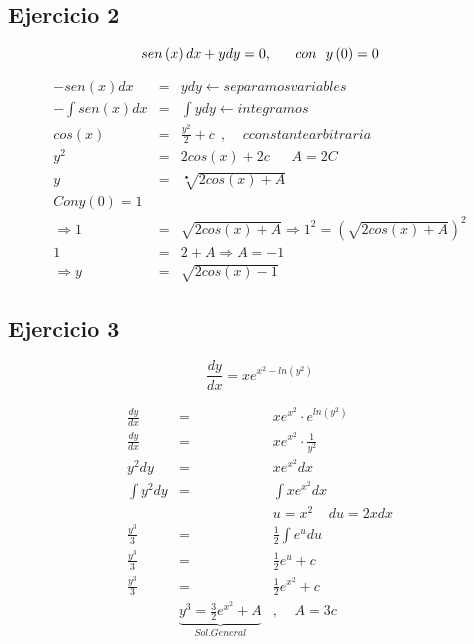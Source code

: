 \documentclass{article}
\begin{document}

\subsection{Ejercicio 2}

\begin{equation}
sen\left( x \right) dx + ydy = 0, \ \ \ \ \ con \ \  y \left(0 \right) = 0 \\
\end{equation}

\begin{eqnarray}
\nonumber -sen\left( x \right) dx &=& ydy \leftarrow separamos variables \\
\nonumber - \int sen\left( x \right) dx &=& \int ydy \leftarrow integramos \\
\nonumber cos \left( x \right) &=& \frac{y^2}{2} + c \ \ , \ \ \ \ \ c constante arbitraria \\
\nonumber y^2 &=& 2cos \left( x \right) + 2c \ \ \ \ \ \ \ A = 2C \\
\nonumber y &=&  \sqrt[•]{2cos \left( x \right) + A} \\
\nonumber Con y \left( 0 \right) = 1 \\
\nonumber  \Rightarrow 1 &=& \sqrt{2cos \left( x \right) + A} \Rightarrow 1^2 = \left( \sqrt{2cos \left( x \right) + A}\right)^2 \\
\nonumber 1 &=& 2 + A \Rightarrow A =-1 \\
\nonumber \Rightarrow  y &=& \sqrt{2cos\left(x \right) -1}
\end{eqnarray}

\subsection{Ejercicio 3}

\begin{equation}
\frac{dy}{dx} = xe^{x^2 -ln\left( y^2 \right)}
\end{equation} 

\begin{eqnarray}
\nonumber \frac{dy}{dx} &=& xe^{x^2} \cdot e^{ln\left( y^2 \right)} \\
\nonumber \frac{dy}{dx} &=& xe^{x^2} \cdot \frac{1}{y^2} \\
\nonumber y^2dy &=& xe^{x^2}dx \\
\nonumber \int y^2dy &=& \int xe^{x^2}dx \\
\nonumber & & u = x^2 \ \ \ \ \  du = 2xdx\\
\nonumber \frac{y^3}{3} &=& \frac{1}{2} \int e^u du \\
\nonumber \frac{y^3}{3} &=& \frac{1}{2}e^u + c \\
\nonumber \frac{y^3}{3} &=& \frac{1}{2}e^{x^2} +c \\
\nonumber &\underbrace{y^3 = \frac{3}{2} e^{x^2} + A}_{Sol. General}& , \ \ \ \ \ A = 3c
\end{eqnarray} 
\end{document}
